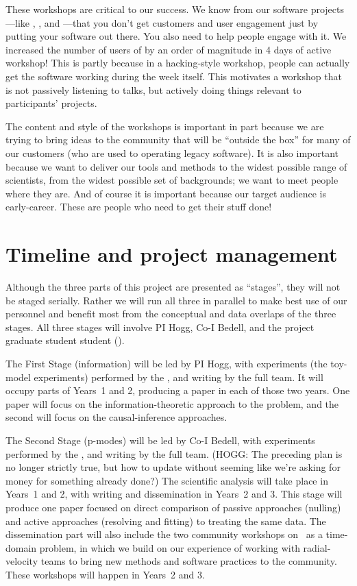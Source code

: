 \documentclass[12pt, letterpaper]{article}
\begin{document}
These workshops are critical to our success.
We know from our software projects---like ,
, and ---that you don't get customers
and user engagement just by putting your software out there.
You also need to help people engage with it.
We increased the number of users of  by an order of
magnitude in 4 days of active workshop!
This is partly because in a hacking-style workshop, people can actually
get the software working during the week itself.
This motivates a workshop that is not passively listening to talks, but actively
doing things relevant to participants' projects.

The content and style of the workshops is important in part because we are trying to bring ideas to the
community that will be ``outside the box'' for many of our customers (who
are used to operating legacy software).
It is also important because we want to deliver our tools and methods
to the widest possible range of scientists, from the widest possible set of
backgrounds; we want to meet people where they are.
And of course it is important because our target audience is early-career.
These are people who need to get their stuff done!

\section{Timeline and project management}

Although the three parts of this project are presented as ``stages'',
they will not be staged serially.
Rather we will run all three in parallel to make best use of our
personnel and benefit most from the conceptual and data overlaps of the three stages.
All three stages will involve PI Hogg, Co-I Bedell, and the project
graduate student student (\GRA). 

The First Stage (information) will be led by PI Hogg, with experiments (the
toy-model experiments) performed by the \GRA, and writing by the full
team.
It will occupy parts of Years~1 and 2, producing a paper
in each of those two years.
One paper will focus on the information-theoretic approach to the problem,
and the second will focus on the causal-inference approaches.

The Second Stage (p-modes) will be led by Co-I Bedell, with
experiments performed by the \GRA, and writing by the full team.
(HOGG: The preceding plan is no longer strictly true, 
but how to update without seeming like we're asking for money for 
something already done?)
The scientific analysis will take place in Years~1 and 2, with
writing and dissemination in Years~2 and 3.
This stage will produce one paper focused on direct comparison of 
passive approaches (nulling) and active approaches (resolving
and fitting) to treating the same data. 
The dissemination part will also include the two community workshops on
\EPRV\ as a time-domain problem, in which we build on our experience
of working with radial-velocity teams to bring new methods and
software practices to the community.
These workshops will happen in Years~2 and 3.
\end{document}

